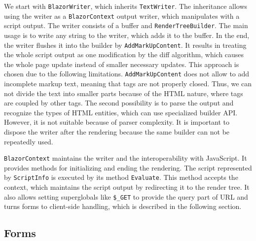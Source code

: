 We start with \texttt{BlazorWriter}, which inherits \texttt{TextWriter}.
The inheritance allows using the writer as a \texttt{BlazorContext} output writer, which manipulates with a script output.
The writer consists of a buffer and \texttt{RenderTreeBuilder}.
The main usage is to write any string to the writer, which adds it to the buffer.
In the end, the writer flushes it into the builder by \texttt{AddMarkUpContent}.
It results in treating the whole script output as one modification by the diff algorithm, which causes the whole page update instead of smaller necessary updates.
This approach is chosen due to the following limitations.
\texttt{AddMarkUpContent} does not allow to add incomplete markup text, meaning that tags are not properly closed.
Thus, we can not divide the text into smaller parts because of the HTML nature, where tags are coupled by other tags.
The second possibility is to parse the output and recognize the types of HTML entities, which can use specialized builder API.
However, it is not suitable because of parser complexity.
It is important to dispose the writer after the rendering because the same builder can not be repeatedly used.
\par
\texttt{BlazorContext} maintains the writer and the interoperability with JavaScript.
It provides methods for initializing and ending the rendering.
The script represented by \texttt{ScriptInfo} is executed by its method \texttt{Evaluate}. This method accepts the context, which maintains the script output by redirecting it to the render tree.
It also allows setting superglobals like \texttt{\$\_GET} to provide the query part of URL and turns forms to client-side 
handling, which is described in the following section.

\subsection{Forms}

